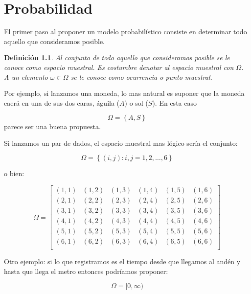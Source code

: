 \documentclass{extreport}
\theoremstyle{definicion}
\newtheorem{definition}{Definición}[chapter]
\theoremstyle{propiedad}
\begin{document}
\chapter{Probabilidad} 
    

El primer paso al proponer un modelo probabilístico consiste en determinar todo aquello que consideramos posible. 

\begin{definition}
Al conjunto de todo aquello que consideramos \emph{posible} se le conoce  como \emph{espacio muestral}. Es costumbre denotar al espacio muestral con $\Omega$. A un elemento $\omega \in \Omega$ se le conoce como \emph{ocurrencia} o \emph{punto muestral}.
\end{definition}



Por ejemplo, si lanzamos una moneda, lo mas natural es suponer que la moneda caerá en una de sus dos caras, águila ($A$) o sol ($S$). En esta caso 

$$
\Omega =\left\{A, S\right\} 
$$
parece ser una buena propuesta. 

Si lanzamos un par de dados, el espacio muestral mas lógico sería el conjunto:

$$
\Omega = \left\{(i, j): i, j = 1,2,\ldots,6\right\}
$$

o bien:

$$
\Omega = \left[
\begin{matrix}
(1,1) & (1,2) & (1,3) & (1,4) & (1,5) & (1,6) \\

(2,1) & (2,2) & (2,3) & (2,4) & (2,5) & (2,6) \\

(3,1) & (3,2) & (3,3) & (3,4) & (3,5) & (3,6) \\

(4,1) & (4,2) & (4,3) & (4,4) & (4,5) & (4,6) \\

(5,1) & (5,2) & (5,3) & (5,4) & (5,5) & (5,6) \\

(6,1) & (6,2) & (6,3) & (6,4) & (6,5) & (6,6) \\

\end{matrix}
\right]
$$

Otro ejemplo: si lo que registramos es el tiempo desde que llegamos al andén y hasta que llega el metro entonces podríamos proponer:

$$
\Omega = [0,\infty)
$$
\end{document}
